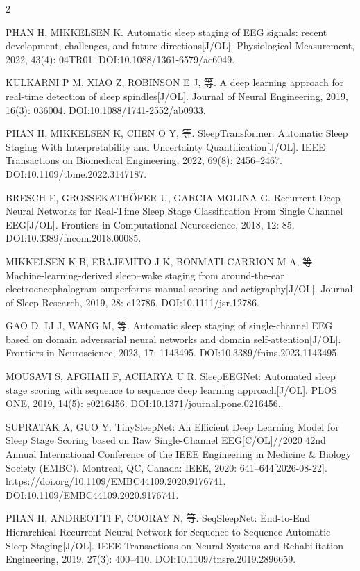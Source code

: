 \documentclass[UTF8,zihao=5,fontset=none]{ctexart}
\begin{document}
\begin{multicols}{2}
{\makebox[25.2pt][l]{[19]}PHAN H, MIKKELSEN K. Automatic sleep staging of EEG signals: recent development, challenges, and future directions[J/OL]. Physiological Measurement, 2022, 43(4): 04TR01. DOI:10.1088/1361-6579/ac6049.\par
\makebox[25.2pt][l]{[20]}KULKARNI P M, XIAO Z, ROBINSON E J, 等. A deep learning approach for real-time detection of sleep spindles[J/OL]. Journal of Neural Engineering, 2019, 16(3): 036004. DOI:10.1088/1741-2552/ab0933.\par
\makebox[25.2pt][l]{[21]}PHAN H, MIKKELSEN K, CHEN O Y, 等. SleepTransformer: Automatic Sleep Staging With Interpretability and Uncertainty Quantification[J/OL]. IEEE Transactions on Biomedical Engineering, 2022, 69(8): 2456--2467. DOI:10.1109/tbme.2022.3147187.\par
\makebox[25.2pt][l]{[22]}BRESCH E, GROSSEKATHÖFER U, GARCIA-MOLINA G. Recurrent Deep Neural Networks for Real-Time Sleep Stage Classification From Single Channel EEG[J/OL]. Frontiers in Computational Neuroscience, 2018, 12: 85. DOI:10.3389/fncom.2018.00085.\par
\makebox[25.2pt][l]{[23]}MIKKELSEN K B, EBAJEMITO J K, BONMATI-CARRION M A, 等. Machine-learning-derived sleep–wake staging from around-the-ear electroencephalogram outperforms manual scoring and actigraphy[J/OL]. Journal of Sleep Research, 2019, 28: e12786. DOI:10.1111/jsr.12786.\par
\makebox[25.2pt][l]{[24]}GAO D, LI J, WANG M, 等. Automatic sleep staging of single-channel EEG based on domain adversarial neural networks and domain self-attention[J/OL]. Frontiers in Neuroscience, 2023, 17: 1143495. DOI:10.3389/fnins.2023.1143495.\par
\makebox[25.2pt][l]{[25]}MOUSAVI S, AFGHAH F, ACHARYA U R. SleepEEGNet: Automated sleep stage scoring with sequence to sequence deep learning approach[J/OL]. PLOS ONE, 2019, 14(5): e0216456. DOI:10.1371/journal.pone.0216456.\par
\makebox[25.2pt][l]{[26]}SUPRATAK A, GUO Y. TinySleepNet: An Efficient Deep Learning Model for Sleep Stage Scoring based on Raw Single-Channel EEG[C/OL]//2020 42nd Annual International Conference of the IEEE Engineering in Medicine \& Biology Society (EMBC). Montreal, QC, Canada: IEEE, 2020: 641--644[2026-08-22]. https://doi.org/10.1109/EMBC44109.2020.9176741. DOI:10.1109/EMBC44109.2020.9176741.\par
\makebox[25.2pt][l]{[27]}PHAN H, ANDREOTTI F, COORAY N, 等. SeqSleepNet: End-to-End Hierarchical Recurrent Neural Network for Sequence-to-Sequence Automatic Sleep Staging[J/OL]. IEEE Transactions on Neural Systems and Rehabilitation Engineering, 2019, 27(3): 400--410. DOI:10.1109/tnsre.2019.2896659.\par
}
\end{multicols}
\end{document}
